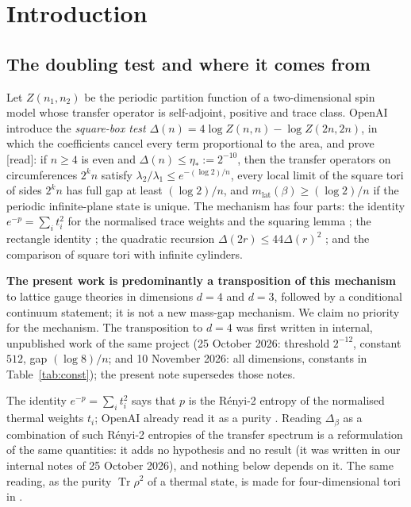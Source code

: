 \documentclass[11pt,a4paper]{article}
\theoremstyle{plain}
\theoremstyle{definition}
\theoremstyle{remark}
\numberwithin{equation}{section}
\newcommand{\Tr}{\operatorname{Tr}}
\newcommand{\st}[1]{\textsf{[#1]}}
\begin{document}
{\small\setcounter{tocdepth}{1}\tableofcontents}

\section{Introduction}\label{sec:intro}

\subsection{The doubling test and where it comes from}
Let $Z(n_1,n_2)$ be the periodic partition function of a two-dimensional spin model whose transfer operator is self-adjoint, positive
and trace class. OpenAI \cite[\S2]{OAI26} introduce the \emph{square-box test} $\Delta(n)=4\log Z(n,n)-\log Z(2n,2n)$, in which the
coefficients cancel every term proportional to the area, and prove \cite[Prop.~2.2]{OAI26} \st{read}: if $n\ge4$ is even and
$\Delta(n)\le\eta_*:=2^{-10}$, then the transfer operators on circumferences $2^kn$ satisfy $\lambda_2/\lambda_1\le e^{-(\log 2)/n}$,
every local limit of the square tori of sides $2^kn$ has full gap at least $(\log2)/n$, and $m_{\mathrm{lat}}(\beta)\ge(\log 2)/n$ if
the periodic infinite-plane state is unique. The mechanism has four parts: the identity $e^{-p}=\sum_it_i^2$ for the normalised trace
weights and the squaring lemma \cite[Lemma~2.1]{OAI26}; the rectangle identity \cite[(2.7)]{OAI26}; the quadratic recursion
$\Delta(2r)\le44\Delta(r)^2$ \cite[(2.12)]{OAI26}; and the comparison of square tori with infinite cylinders.

\textbf{The present work is predominantly a transposition of this mechanism} to lattice gauge theories in dimensions $d=4$ and $d=3$,
followed by a conditional continuum statement; it is not a new mass-gap mechanism. We claim no priority for the mechanism. The transposition
to $d=4$ was first written in internal, unpublished work of the same project (25 October 2026: threshold $2^{-12}$, constant $512$, gap
$(\log8)/n$; and 10 November 2026: all dimensions, constants in Table~\ref{tab:const}); the present note supersedes those notes.

The identity $e^{-p}=\sum_it_i^2$ says that $p$ is the R\'enyi-2 entropy of the normalised thermal weights $t_i$; OpenAI already read it as
a purity \cite[\S2]{OAI26}. Reading $\Delta_\beta$ as a combination of such R\'enyi-2 entropies of the transfer spectrum
is a reformulation of the same quantities: it adds no hypothesis and no result (it was written in our internal notes of 25 October 2026),
and nothing below depends on it. The same reading, as the purity $\Tr\rho^2$ of a thermal state, is made for four-dimensional tori in
\cite[after Proposition~7.57]{BB26v5}.
\end{document}
